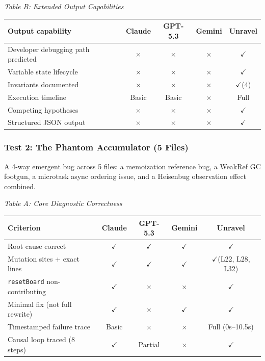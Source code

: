 \documentclass[12pt,a4paper]{article}
\newcommand{\code}[1]{\texttt{\small #1}}
\newcommand{\yes}{$\checkmark$}
\newcommand{\no}{$\times$}
\begin{document}
\vspace{4pt}
\textit{Table B: Extended Output Capabilities}
\vspace{2pt}

\begin{center}
\small\begin{tabular}{@{}p{5.2cm} cccc@{}}
\toprule
\textbf{Output capability} & \textbf{Claude} & \textbf{GPT-5.3} & \textbf{Gemini} & \textbf{Unravel} \\
\midrule
Developer debugging path predicted & \no & \no & \no & \yes \\
Variable state lifecycle           & \no & \no & \no & \yes \\
Invariants documented              & \no & \no & \no & \yes (4) \\
Execution timeline                 & Basic & Basic & \no & Full \\
Competing hypotheses               & \no & \no & \no & \yes \\
Structured JSON output             & \no & \no & \no & \yes \\
\bottomrule
\end{tabular}
\end{center}

\subsubsection{Test 2: The Phantom Accumulator (5 Files)}

A 4-way emergent bug across 5 files: a memoization reference bug, a WeakRef GC footgun,
a microtask async ordering issue, and a Heisenbug observation effect combined.

\vspace{4pt}
\textit{Table A: Core Diagnostic Correctness}
\vspace{2pt}

\begin{center}
\small\begin{tabular}{@{}p{5.2cm} cccc@{}}
\toprule
\textbf{Criterion} & \textbf{Claude} & \textbf{GPT-5.3} & \textbf{Gemini} & \textbf{Unravel} \\
\midrule
Root cause correct               & \yes & \yes & \yes & \yes \\
Mutation sites + exact lines     & \yes & \yes & \yes & \yes (L22, L28, L32) \\
\code{resetBoard} non-contributing & \yes & \no & \no & \yes \\
Minimal fix (not full rewrite)   & \yes & \no  & \yes & \yes \\
Timestamped failure trace        & Basic & \no & \no & Full (0s--10.5s) \\
Causal loop traced (8 steps)     & \yes & Partial & \no & \yes \\
\bottomrule
\end{tabular}
\end{center}
\end{document}
